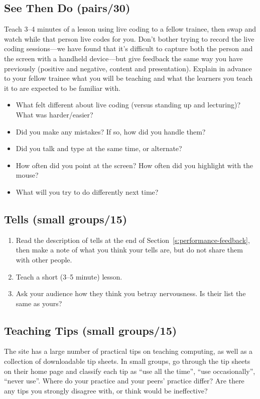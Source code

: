 \subsection*{See Then Do (pairs/30)}

Teach 3--4 minutes of a lesson using live coding to a fellow trainee,
then swap and watch while that person live codes for you. Don't bother
trying to record the live coding sessions---we have found that it's
difficult to capture both the person and the screen with a handheld
device---but give feedback the same way you have previously (positive and
negative, content and presentation). Explain in advance to your fellow
trainee what you will be teaching and what the learners you teach it to
are expected to be familiar with.

\begin{itemize}
\item
  What felt different about live coding (versus standing up and
  lecturing)? What was harder/easier?
\item
  Did you make any mistakes? If so, how did you handle them?
\item
  Did you talk and type at the same time, or alternate?
\item
  How often did you point at the screen? How often did you highlight
  with the mouse?
\item
  What will you try to do differently next time?
\end{itemize}

\subsection*{Tells (small groups/15)}

\begin{enumerate}
\item
  Read the description of tells at the end of
  Section~\ref{s:performance-feedback}, then make a note of what you
  think your tells are, but do not share them with other people.
\item
  Teach a short (3--5 minute) lesson.
\item
  Ask your audience how they think you betray nervousness. Is their
  list the same as yours?
\end{enumerate}

\subsection*{Teaching Tips (small groups/15)}

The  site has a large number of
practical tips on teaching computing, as well as a collection of
downloadable tip sheets. In small groups, go through the tip sheets on
their home page and classify each tip as ``use all the time'', ``use
occasionally'', ``never use''. Where do your practice and your peers'
practice differ? Are there any tips you strongly disagree with, or
think would be ineffective?
